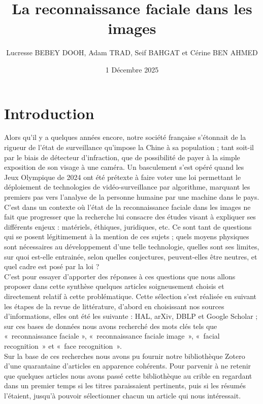 \documentclass[11pt]{article}
\title{La reconnaissance faciale dans les images}
\author{Lucresse BEBEY DOOH, Adam TRAD, Seif BAHGAT et Cérine BEN AHMED}
\date{1 Décembre 2025}
\begin{document}
\maketitle

\section{Introduction}
Alors qu’il y a quelques années encore, notre société française s’étonnait de la rigueur de l’état de surveillance qu’impose la 
Chine à sa population ; tant soit-il par le biais de détecteur d’infraction, que de possibilité de payer à la simple exposition 
de son visage à une caméra. Un basculement s’est opéré quand les Jeux Olympique de 2024 ont été prétexte à faire voter une loi 
permettant le déploiement de technologies de vidéo-surveillance par algorithme, marquant les premiers pas vers l’analyse de la 
personne humaine par une machine dans le pays.\\
C’est dans un contexte où l’état de la reconnaissance faciale dans les images ne fait que progresser que la recherche lui 
consacre des études visant à expliquer ses différents enjeux : matériels, éthiques, juridiques, etc.
Ce sont tant de questions qui se posent légitimement à la mention de ces sujets ; quels moyens physiques sont nécessaires au 
développement d’une telle technologie, quelles sont ses limites, sur quoi est-elle entrainée, selon quelles conjectures, 
peuvent-elles être neutres, et quel cadre est posé par la loi ?\\
C’est pour essayer d’apporter des réponses à ces questions que nous allons proposer dans cette synthèse quelques articles 
soigneusement choisis et directement relatif à cette problématique. Cette sélection s’est réalisée en suivant les étapes de la 
revue de littérature, d’abord en choisissant nos sources d’informations, elles ont été les suivante : HAL, arXiv, DBLP et Google 
Scholar ; sur ces bases de données nous avons recherché des mots clés tels que « reconnaissance faciale », « reconnaissance 
faciale image », « facial recognition » et « face recognition ».\\
Sur la base de ces recherches nous avons pu fournir notre bibliothèque Zotero d’une quarantaine d’articles en apparence 
cohérents. Pour parvenir à ne retenir que quelques articles nous avons passé cette bibliothèque au crible en regardant dans un 
premier temps si les titres paraissaient pertinents, puis si les résumés l’étaient, jusqu’à pouvoir sélectionner chacun un 
article qui nous intéressait.
\end{document}
